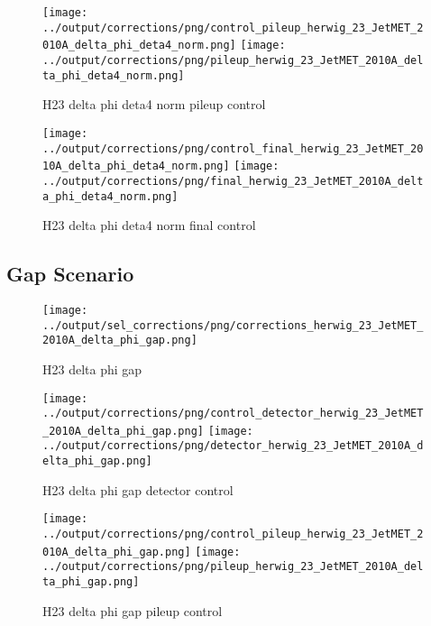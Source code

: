 \documentclass[11pt]{book}
\begin{document}
\begin{figure}[ht]
\centering
\texttt{[image: ../output/corrections/png/control\_pileup\_herwig\_23\_JetMET\_2010A\_delta\_phi\_deta4\_norm.png]}
\texttt{[image: ../output/corrections/png/pileup\_herwig\_23\_JetMET\_2010A\_delta\_phi\_deta4\_norm.png]}
\caption{H23 delta phi deta4 norm pileup control}
\label{fig:H23_JetMET_2010A_delta_phi_deta4_norm_pileup_control}
\end{figure}


\begin{figure}[ht]
\centering
\texttt{[image: ../output/corrections/png/control\_final\_herwig\_23\_JetMET\_2010A\_delta\_phi\_deta4\_norm.png]}
\texttt{[image: ../output/corrections/png/final\_herwig\_23\_JetMET\_2010A\_delta\_phi\_deta4\_norm.png]}
\caption{H23 delta phi deta4 norm final control}
\label{fig:H23_JetMET_2010A_delta_phi_deta4_norm_final_control}
\end{figure}

\clearpage
\subsection{Gap Scenario}

\begin{figure}[ht]
\centering
\texttt{[image: ../output/sel\_corrections/png/corrections\_herwig\_23\_JetMET\_2010A\_delta\_phi\_gap.png]}
\caption{H23 delta phi gap}
\label{fig:H23_JetMET_2010A_delta_phi_gap}
\end{figure}


\begin{figure}[ht]
\centering
\texttt{[image: ../output/corrections/png/control\_detector\_herwig\_23\_JetMET\_2010A\_delta\_phi\_gap.png]}
\texttt{[image: ../output/corrections/png/detector\_herwig\_23\_JetMET\_2010A\_delta\_phi\_gap.png]}
\caption{H23 delta phi gap detector control}
\label{fig:H23_JetMET_2010A_delta_phi_gap_detector_control}
\end{figure}

\begin{figure}[ht]
\centering
\texttt{[image: ../output/corrections/png/control\_pileup\_herwig\_23\_JetMET\_2010A\_delta\_phi\_gap.png]}
\texttt{[image: ../output/corrections/png/pileup\_herwig\_23\_JetMET\_2010A\_delta\_phi\_gap.png]}
\caption{H23 delta phi gap pileup control}
\label{fig:H23_JetMET_2010A_delta_phi_gap_pileup_control}
\end{figure}
\end{document}
